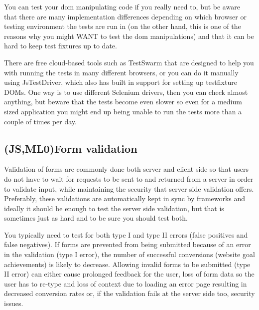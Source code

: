 \documentclass[11pt]{article}
\begin{document}
You can test your \gls{dom} manipulating code if you really need to, but be aware that there are many implementation differences depending on which browser or testing environment the tests are run in (on the other hand, this is one of the reasons why you might WANT to test the \gls{dom} manipulations) and that it can be hard to keep test fixtures up to date.

There are free cloud-based tools such as TestSwarm that are designed to help you with running the tests in many different browsers, or you can do it manually using JsTestDriver, which also has built in support for setting up
\gls{testfixture} DOMs. One way is to use different Selenium drivers, then you can check almost anything, but beware that the tests become even slower so even for a medium sized application you might end up being unable to run the tests more than a couple of times per day.

\subsection{(JS,ML0)Form validation}

Validation of forms are commonly done both server and client side so that users do not have to wait for requests to be sent to and returned from a server in order to validate input, while maintaining the security that server side validation offers. Preferably, these validations are automatically kept in sync by frameworks and ideally it should be enough to test the server side validation, but that is sometimes just as hard and to be sure you should test both.

You typically need to test for both type I and type II errors (false positives and false negatives). If forms are prevented from being submitted because of an error in the validation (type I error), the number of successful conversions (website goal achievements) is likely to decrease. Allowing invalid forms to be submitted (type II error) can either cause prolonged feedback for the user, loss of form data so the user has to re-type and loss of context due to loading an error page resulting in decreased conversion rates or, if the validation fails at the server side too, security issues.
\end{document}
